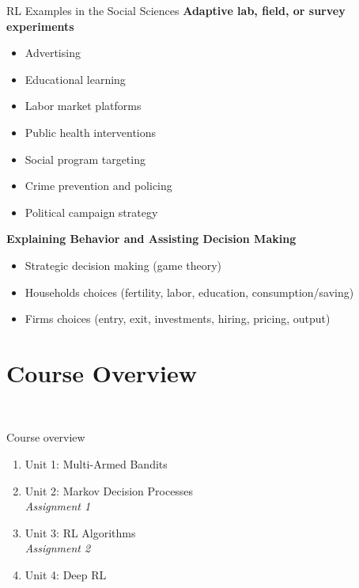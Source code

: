 \documentclass[11pt,table]{beamer}
\begin{document}
\begin{frame}{RL Examples in the Social Sciences}
\textbf{Adaptive lab, field, or survey experiments}
\begin{itemize}
\item Advertising\pause
\item Educational learning\pause
\item Labor market platforms\pause
\item Public health interventions\pause
\item Social program targeting\pause
\item Crime prevention and policing\pause
\item Political campaign strategy\pause
\end{itemize}

\textbf{Explaining Behavior and Assisting Decision Making}
\begin{itemize}
\item Strategic decision making (game theory)\pause
\item Households choices (fertility, labor, education, consumption/saving)\pause
\item Firms choices (entry, exit, investments, hiring, pricing, output)
\end{itemize}
\end{frame}




\section{Course Overview}
{
\begin{frame}
\centering
\Huge
\textcolor{white}{Course Overview}
\thispagestyle{empty}
\end{frame}
}

\begin{frame}{Course overview}
\begin{enumerate}
    \item Unit 1: Multi-Armed Bandits
    \item Unit 2: Markov Decision Processes\\
		\emph{Assignment 1}
		
    \item Unit 3: RL Algorithms\\
		\emph{Assignment 2}
		
    \item Unit 4: Deep RL
\end{enumerate}
\end{frame}
\end{document}
